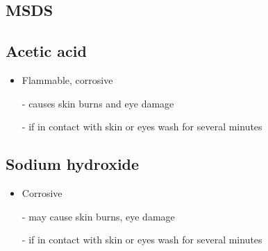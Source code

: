 \documentclass[a4paper, british]{article}
\begin{document}
\begin{appendices}
\newpage

\section{MSDS}

\subsection*{Acetic acid}

\begin{itemize}
    \item Flammable, corrosive
    \item[-] causes skin burns and eye damage
    \item[-] if in contact with skin or eyes wash for several minutes  
\end{itemize}

\subsection*{Sodium hydroxide}

\begin{itemize}
    \item Corrosive
    \item[-] may cause skin burns, eye damage
    \item[-] if in contact with skin or eyes wash for several minutes  
\end{itemize}

\end{appendices}
\end{document}
